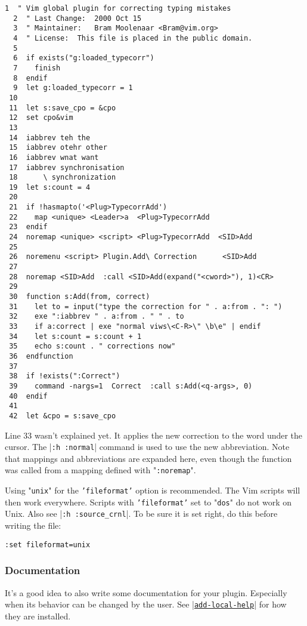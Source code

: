 \begin{Verbatim}[samepage=true]
  1  " Vim global plugin for correcting typing mistakes
  2  " Last Change:  2000 Oct 15
  3  " Maintainer:   Bram Moolenaar <Bram@vim.org>
  4  " License:  This file is placed in the public domain.
  5
  6  if exists("g:loaded_typecorr")
  7    finish
  8  endif
  9  let g:loaded_typecorr = 1
 10
 11  let s:save_cpo = &cpo
 12  set cpo&vim
 13
 14  iabbrev teh the
 15  iabbrev otehr other
 16  iabbrev wnat want
 17  iabbrev synchronisation
 18      \ synchronization
 19  let s:count = 4
 20
 21  if !hasmapto('<Plug>TypecorrAdd')
 22    map <unique> <Leader>a  <Plug>TypecorrAdd
 23  endif
 24  noremap <unique> <script> <Plug>TypecorrAdd  <SID>Add
 25
 26  noremenu <script> Plugin.Add\ Correction      <SID>Add
 27
 28  noremap <SID>Add  :call <SID>Add(expand("<cword>"), 1)<CR>
 29
 30  function s:Add(from, correct)
 31    let to = input("type the correction for " . a:from . ": ")
 32    exe ":iabbrev " . a:from . " " . to
 33    if a:correct | exe "normal viws\<C-R>\" \b\e" | endif
 34    let s:count = s:count + 1
 35    echo s:count . " corrections now"
 36  endfunction
 37
 38  if !exists(":Correct")
 39    command -nargs=1  Correct  :call s:Add(<q-args>, 0)
 40  endif
 41
 42  let &cpo = s:save_cpo
\end{Verbatim}

Line 33 wasn't explained yet.
It applies the new correction to the word under the cursor.
The |\texttt{:h :normal}| command is used to use the new abbreviation.
Note that mappings and abbreviations are expanded here, even though the function was called from a mapping defined with "\texttt{:noremap}".

Using "\texttt{unix}" for the \texttt{'fileformat'} option is recommended.
The Vim scripts will then work everywhere.
Scripts with \texttt{'fileformat'} set to "\texttt{dos}" do not work on Unix.
Also see |\texttt{:h :source\_crnl}|.
To be sure it is set right, do this before writing the file:

\begin{Verbatim}[samepage=true]
 :set fileformat=unix
\end{Verbatim}

\subsubsection{Documentation}
\label{write-local-help}
It's a good idea to also write some documentation for your plugin.
Especially when its behavior can be changed by the user.
See \hyperref[add-local-help]{|\texttt{add-local-help}|} for how they are installed.


